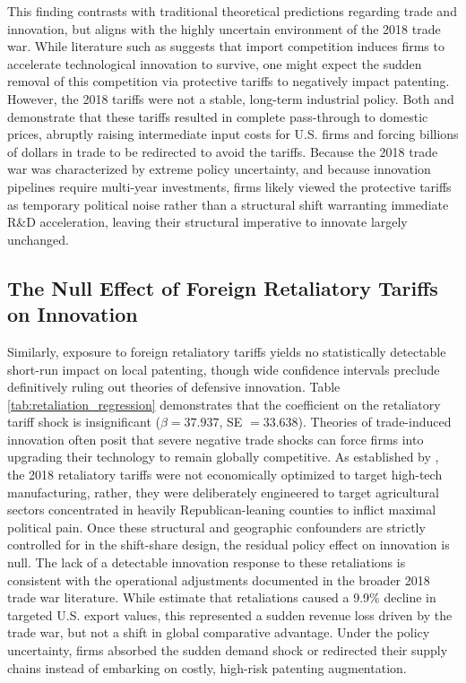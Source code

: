 \documentclass[12pt]{article}
\numberwithin{figure}{section}
\numberwithin{table}{section}
\begin{document}
This finding contrasts with traditional theoretical predictions regarding trade and innovation, but aligns with the highly uncertain environment of the 2018 trade war. While literature such as \cite{Bloom2011} suggests that import competition induces firms to accelerate technological innovation to survive, one might expect the sudden removal of this competition via protective tariffs to negatively impact patenting. However, the 2018 tariffs were not a stable, long-term industrial policy. Both \cite{Amiti2019} and \cite{Fajgelbaum2020} demonstrate that these tariffs resulted in complete pass-through to domestic prices, abruptly raising intermediate input costs for U.S. firms and forcing billions of dollars in trade to be redirected to avoid the tariffs. Because the 2018 trade war was characterized by extreme policy uncertainty, and because innovation pipelines require multi-year investments, firms likely viewed the protective tariffs as temporary political noise rather than a structural shift warranting immediate R\&D acceleration, leaving their structural imperative to innovate largely unchanged.

\subsection{The Null Effect of Foreign Retaliatory Tariffs on Innovation}

Similarly, exposure to foreign retaliatory tariffs yields no statistically detectable short-run impact on local patenting, though wide confidence intervals preclude definitively ruling out theories of defensive innovation. Table \ref{tab:retaliation_regression} demonstrates that the coefficient on the retaliatory tariff shock is insignificant ($\beta=37.937$, SE $=33.638$). Theories of trade-induced innovation often posit that severe negative trade shocks can force firms into upgrading their technology to remain globally competitive. As established by \cite{Fajgelbaum2020}, the 2018 retaliatory tariffs were not economically optimized to target high-tech manufacturing, rather, they were deliberately engineered to target agricultural sectors concentrated in heavily Republican-leaning counties to inflict maximal political pain. Once these structural and geographic confounders are strictly controlled for in the shift-share design, the residual policy effect on innovation is null. The lack of a detectable innovation response to these retaliations is consistent with the operational adjustments documented in the broader 2018 trade war literature. While \cite{Fajgelbaum2020} estimate that retaliations caused a 9.9\% decline in targeted U.S. export values, this represented a sudden revenue loss driven by the trade war, but not a shift in global comparative advantage. Under the policy uncertainty, firms absorbed the sudden demand shock or redirected their supply chains instead of embarking on costly, high-risk patenting augmentation.
\end{document}
